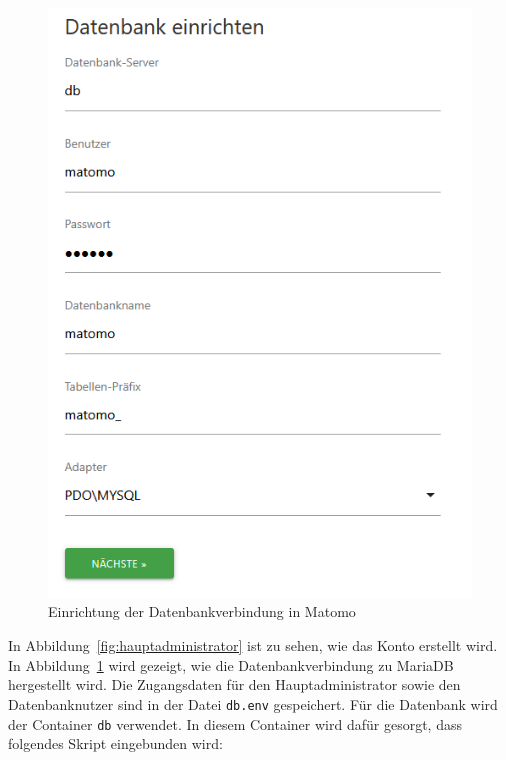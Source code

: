 \begin{figure}[H]
\begin{minipage}{0.49\textwidth}
        \includegraphics[width=\linewidth, keepaspectratio]{images/setup-datenbank.png}
        \caption{Einrichtung der Datenbankverbindung in Matomo}
        \label{fig:setup-datenbank}
    \end{minipage}
\end{figure}

In Abbildung~\ref{fig:hauptadministrator} ist zu sehen, wie das Konto erstellt wird. In Abbildung~\ref{fig:setup-datenbank} wird gezeigt, wie die Datenbankverbindung zu MariaDB hergestellt wird. Die Zugangsdaten für den Hauptadministrator sowie den Datenbanknutzer sind in der Datei \texttt{db.env} gespeichert. Für die Datenbank wird der Container \texttt{db} verwendet. In diesem Container wird dafür gesorgt, dass folgendes Skript eingebunden wird: 

\begin{figure}[H]
    \centering
    \begin{minipage}{\textwidth}
        
    \end{minipage}
\end{figure}

